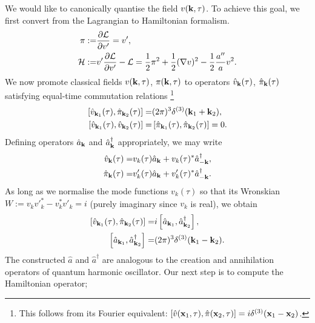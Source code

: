 We would like to canonically quantise the field $v(\mathbf{k},\tau)$. To achieve this goal, we first convert from the Lagrangian to Hamiltonian formalism.
\begin{align}
	\pi :=& \frac{\partial \mathcal{L}}{\partial v'} = v', \\
	\mathcal{H} :=& v'\frac{\partial \mathcal{L}}{\partial v'} - \mathcal{L} = \frac{1}{2} \pi^2 + \frac{1}{2} (\nabla v)^2 - \frac{1}{2} \frac{a''}{a} v^2 .
\end{align}
We now promote classical fields $v(\mathbf{k},\tau)$, $\pi(\mathbf{k},\tau)$ to operators $\hat{v}_\mathbf{k}(\tau)$, $\hat{\pi}_\mathbf{k}(\tau)$ satisfying equal-time commutation relations \footnote{This follows from its Fourier equivalent: $[\hat{v}(\mathbf{x}_1,\tau),\hat{\pi}(\mathbf{x}_2,\tau)] = i\delta^{(3)}(\mathbf{x}_1 - \mathbf{x}_2)$.}
\begin{align}
	\left[ \hat{v}_{\mathbf{k}_1}(\tau), \hat{\pi}_{\mathbf{k}_2}(\tau) \right] =& (2\pi)^3 \delta^{(3)}(\mathbf{k}_1 + \mathbf{k}_2), \\
	\left[ \hat{v}_{\mathbf{k}_1}(\tau), \hat{v}_{\mathbf{k}_2}(\tau) \right] =& \left[ \hat{\pi}_{\mathbf{k}_1}(\tau), \hat{\pi}_{\mathbf{k}_2}(\tau) \right] = 0.
\end{align}
Defining operators $\hat{a}_\mathbf{k}$ and $\hat{a}_\mathbf{k}^\dagger$ appropriately, we may write
\begin{align}
	\hat{v}_\mathbf{k} (\tau) =& v_k(\tau) \hat{a}_\mathbf{k} + v_k(\tau)^* \hat{a}_{-\mathbf{k}}^\dagger,  \\
	\hat{\pi}_\mathbf{k} (\tau) =& {v'_k}(\tau) \hat{a}_\mathbf{k} + {v'_k}(\tau)^* \hat{a}_{-\mathbf{k}}^\dagger.
\end{align}
As long as we normalise the mode functions $v_k(\tau)$ so that its Wronskian $W := v_k v'^*_k - v_k^* v'_k = i$ (purely imaginary since $v_k$ is real), we obtain
\begin{align}
	\left[ \hat{v}_{\mathbf{k}_1}(\tau), \hat{\pi}_{\mathbf{k}_2}(\tau) \right] =& i \left[ \hat{a}_{\mathbf{k}_1}, \hat{a}^\dagger_{\mathbf{k}_2} \right], \\
	\left[ \hat{a}_{\mathbf{k}_1}, \hat{a}^\dagger_{\mathbf{k}_2} \right] =& (2\pi)^3 \delta^{(3)}(\mathbf{k}_1 - \mathbf{k}_2).	\label{eqn:canonical_quantisation_commutation_relation_a}
\end{align}
The constructed $\hat{a}$ and $\hat{a}^\dagger$ are analogous to the creation and annihilation operators of quantum harmonic oscillator. Our next step is to compute the Hamiltonian operator;
